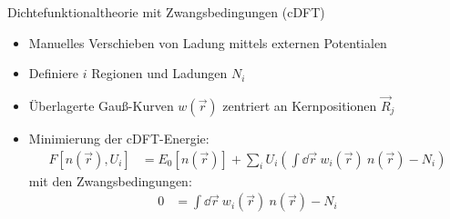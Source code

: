 \begin{frame}{Dichtefunktionaltheorie mit Zwangsbedingungen (cDFT)}
\hspace*{-.5cm}
\begin{minipage}{0.75\textwidth}
	\vspace*{-1.5cm}
	\begin{itemize}
		\item Manuelles Verschieben von Ladung mittels externen Potentialen
		\item Definiere $i$ Regionen und Ladungen $N_i$
		\item Überlagerte Gauß-Kurven $w(\vec{r})$ zentriert an Kernpositionen $\vec{R}_j$
	\end{itemize}
\end{minipage}
\begin{minipage}{0.25\textwidth}
	\vspace*{-.8cm}
\end{minipage}
\hspace*{-.5cm}
\begin{minipage}{\textwidth}
\vspace*{-1cm}
\begin{itemize}
	\item Minimierung der cDFT-Energie:
	\begin{align*}
	F\left[n\left(\vec{r}\right), U_i\right] &= E_0\left[n\left(\vec{r}\right)\right] + 
	\sum_i U_i\left(\int\dd\vec{r}\ w_i\left(\vec{r}\right)\ n\left(\vec{r}\right) - N_i\right)
	\end{align*}
	mit den Zwangsbedingungen:
	\begin{align*}
	0 &= \int\dd\vec{r}\ w_i\left(\vec{r}\right)\ n\left(\vec{r}\right) - N_i
	\end{align*}
\end{itemize}
\end{minipage}
\end{frame}

